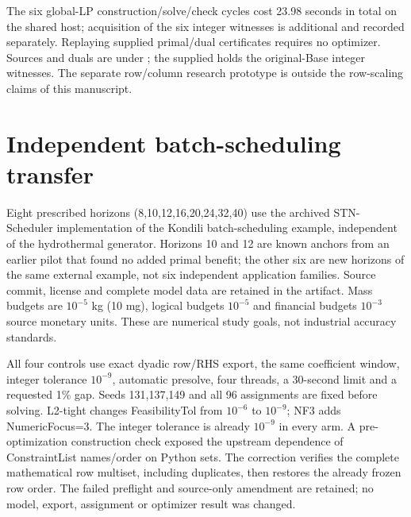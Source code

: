 \documentclass[11pt]{article}
\begin{document}
\begin{table}[tb]
\centering\small\setlength{\tabcolsep}{3pt}
\caption{Verified original-model intervals from six unfixed exact LP relaxations
and six complete exact integer witnesses. Displayed costs are rounded; certificates
retain exact rationals. A width over 1\% is an unresolved interval, not evidence
that the integer optimum is known or that the relaxation gap equals that width.}
\label{tab:global-lp-certificates}
\resizebox{\linewidth}{!}{}
\end{table}

The six global-LP construction/solve/check cycles cost 23.98 seconds in total on
the shared host; acquisition of the six integer witnesses is additional and
recorded separately. Replaying supplied primal/dual certificates requires no
optimizer. Sources and duals are under ;
the supplied  holds
the original-Base integer witnesses. The separate row/column research prototype
is outside the row-scaling claims of this manuscript.

\FloatBarrier
\section{Independent batch-scheduling transfer}
Eight prescribed horizons (8,10,12,16,20,24,32,40) use the archived
STN-Scheduler implementation of the Kondili batch-scheduling example, independent
of the hydrothermal generator. Horizons 10 and 12 are known anchors from an
earlier pilot that found no added primal benefit; the other six are new horizons
of the same external example, not six independent application families.
Source commit, license and complete model data are retained in the artifact.
Mass budgets are $10^{-5}$ kg (10 mg), logical budgets $10^{-5}$ and financial
budgets $10^{-3}$ source monetary units. These are numerical study goals,
not industrial accuracy standards.

All four controls use exact dyadic row/RHS export, the same coefficient window,
integer tolerance $10^{-9}$, automatic presolve, four threads, a 30-second limit
and a requested 1\% gap. Seeds 131,137,149 and all 96 assignments are fixed before
solving. L2-tight changes FeasibilityTol from $10^{-6}$ to $10^{-9}$; NF3 adds
NumericFocus=3. The integer tolerance is already $10^{-9}$ in every arm.
A pre-optimization construction check exposed the upstream dependence of
ConstraintList names/order on Python sets. The correction verifies the complete
mathematical row multiset, including duplicates, then restores the already frozen
row order. The failed preflight and source-only amendment are retained; no model,
export, assignment or optimizer result was changed.
\end{document}
